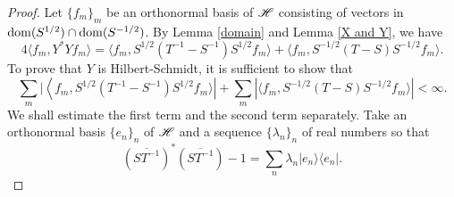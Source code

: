 \documentclass[12pt]{article}
\theoremstyle{plain}
\numberwithin{equation}{section}
\theoremstyle{remark}
\begin{document}
\begin{proof}
Let $\{f_m\}_m$ be an orthonormal basis of $\mathscr{H}$ consisting of vectors in $\mathop{\mathrm{dom}}(S^{1/2})\cap\mathop{\mathrm{dom}}(S^{-1/2})$.
By Lemma \ref{domain} and Lemma \ref{X and Y}, we have
\[
4\langle f_m,Y^*Yf_m\rangle = \langle f_m,S^{1/2}(T^{-1}-S^{-1})S^{1/2}f_m\rangle + \langle f_m,S^{-1/2}(T-S)S^{-1/2}f_m\rangle.
\]
To prove that $Y$ is Hilbert-Schmidt, it is sufficient to show that
\[
\sum_m|\left\langle f_m,S^{1/2}(T^{-1}-S^{-1})S^{1/2}f_m\rangle\right| + \sum_m\left|\langle f_m,S^{-1/2}(T-S)S^{-1/2}f_m\rangle\right|<\infty.
\]
We shall estimate the first term and the second term separately.
Take an orthonormal basis $\{e_n\}_n$ of $\mathscr{H}$ and a sequence $\{\lambda_n\}_n$ of real numbers so that
\[
 \left(\overline{ST^{-1}}\right)^*\left(\overline{ST^{-1}}\right)-1 = \sum_n\lambda_n|e_n\rangle\langle e_n|.
\]


\end{proof}
\end{document}
